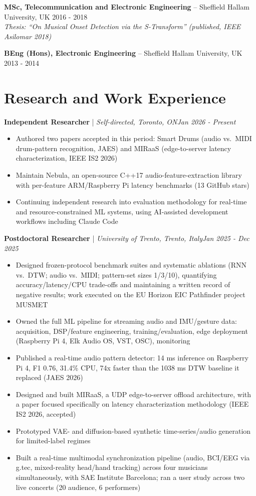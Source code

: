 \documentclass[11pt]{article}
\newenvironment{cvrole}[5]{%
  \par\noindent\textbf{\large #1} | \textit{\small #2, #3}\hfill \textit{\small #4 - #5}\par
  \begin{itemize}[leftmargin=2em, itemsep=-0.3em, topsep=-0.5em]%
}{%
  \end{itemize}\par\noindent\mbox{}\par\vspace{0.1em}%
}
\begin{document}
\textbf{MSc, Telecommunication and Electronic Engineering} -- Sheffield Hallam University, UK \hfill 2016 - 2018 \\
\textit{Thesis: ``On Musical Onset Detection via the S-Transform'' (published, IEEE Asilomar 2018)}

\textbf{BEng (Hons), Electronic Engineering} -- Sheffield Hallam University, UK \hfill 2013 - 2014

\section*{Research and Work Experience}

\begin{cvrole}{Independent Researcher}{Self-directed}{Toronto, ON}{Jan 2026}{Present}
    \item Authored two papers accepted in this period: Smart Drums (audio vs.\ MIDI drum-pattern recognition, JAES) and MIRaaS (edge-to-server latency characterization, IEEE IS2 2026)
    \item Maintain Nebula, an open-source C++17 audio-feature-extraction library with per-feature ARM/Raspberry Pi latency benchmarks (13 GitHub stars)
    \item Continuing independent research into evaluation methodology for real-time and resource-constrained ML systems, using AI-assisted development workflows including Claude Code
\end{cvrole}

\begin{cvrole}{Postdoctoral Researcher}{University of Trento}{Trento, Italy}{Jan 2025}{Dec 2025}
    \item Designed frozen-protocol benchmark suites and systematic ablations (RNN vs.\ DTW; audio vs.\ MIDI; pattern-set sizes 1/3/10), quantifying accuracy/latency/CPU trade-offs and maintaining a written record of negative results; work executed on the EU Horizon EIC Pathfinder project MUSMET
    \item Owned the full ML pipeline for streaming audio and IMU/gesture data: acquisition, DSP/feature engineering, training/evaluation, edge deployment (Raspberry Pi 4, Elk Audio OS, VST, OSC), monitoring
    \item Published a real-time audio pattern detector: 14 ms inference on Raspberry Pi 4, F1 0.76, 31.4\% CPU, 74x faster than the 1038 ms DTW baseline it replaced (JAES 2026)
    \item Designed and built MIRaaS, a UDP edge-to-server offload architecture, with a paper focused specifically on latency characterization methodology (IEEE IS2 2026, accepted)
    \item Prototyped VAE- and diffusion-based synthetic time-series/audio generation for limited-label regimes
    \item Built a real-time multimodal synchronization pipeline (audio, BCI/EEG via g.tec, mixed-reality head/hand tracking) across four musicians simultaneously, with SAE Institute Barcelona; ran a user study across two live concerts (20 audience, 6 performers)
\end{cvrole}
\end{document}
